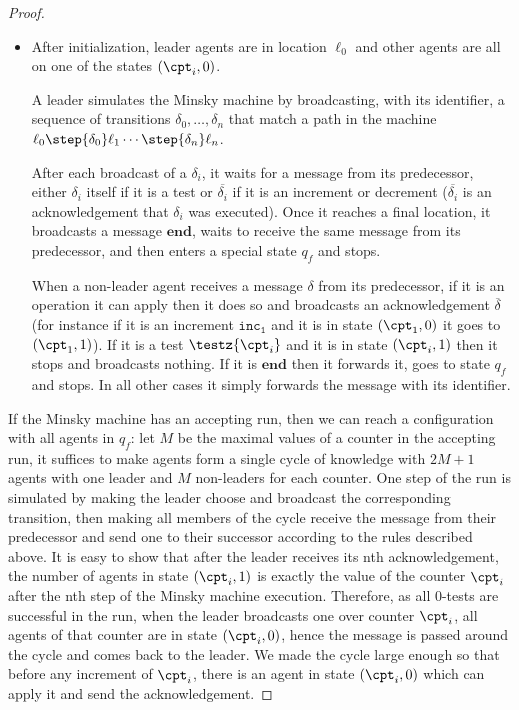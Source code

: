 \begin{proof}
\begin{itemize}
		\item After initialization, leader agents are in location $\ell_0$ and other agents are all on one of the states $(\cpt_i, 0)$.
		
		A leader simulates the Minsky machine by broadcasting,  with its identifier, a sequence of transitions $\delta_0, \ldots, \delta_n$ that match a path in the machine $\ell_0 \step{\delta_0} \ell_1  \cdots \step{\delta_n} \ell_n$. 
		
		After each broadcast of a $\delta_i$, it waits for a message from its predecessor, either $\delta_i$ itself if it is a test or $\overline{\delta_i}$ if it is an increment or decrement ($\overline{\delta_i}$ is an acknowledgement  that $\delta_i$ was executed).
		Once it reaches a final location, it broadcasts a message  $\mathbf{end}$, waits to receive the same message from its predecessor, and then enters a special state $q_f$ and stops.
		
		When a non-leader agent receives a message $\delta$ from its predecessor, if it is an operation it can apply then it does so and broadcasts an acknowledgement $\overline{\delta}$ (for instance if it is an increment $\mathtt{inc_1}$ and it is in state $(\cpt_1, 0)$ it goes to $(\cpt_1, 1)$). 
		If it is a test $\testz{\cpt_i}$ and it is in state $(\cpt_i, 1)$ then it stops and broadcasts nothing.
		If it is $\mathbf{end}$ then it forwards it, goes to state $q_f$ and stops.
		In all other cases it simply forwards the message with its identifier.
	\end{itemize}

If the Minsky machine has an accepting run, then we can reach a configuration with all agents in $q_f$: let $M$ be the maximal values of a counter in the accepting run, it suffices to make agents form a single cycle of knowledge with $2M+1$ agents with one leader and $M$ non-leaders for each counter.
One step of the run is simulated by making the leader choose and broadcast the corresponding transition, then making all members of the cycle receive the message from their predecessor and send one to their successor according to the rules described above. It is easy to show that after the leader receives its nth acknowledgement, the number of agents in state $(\cpt_i, 1)$ is exactly the value of the counter $\cpt_i$ after the nth step of the Minsky machine execution.
Therefore, as all 0-tests are successful in the run, when the leader broadcasts one over counter $\cpt_i$, all agents of that counter are in state $(\cpt_i, 0)$, hence the message is passed around the cycle and comes back to the leader.
We made the cycle large enough so that before any increment of $\cpt_i$, there is an agent in state $(\cpt_i, 0)$ which can apply it and send the acknowledgement.


\end{proof}
